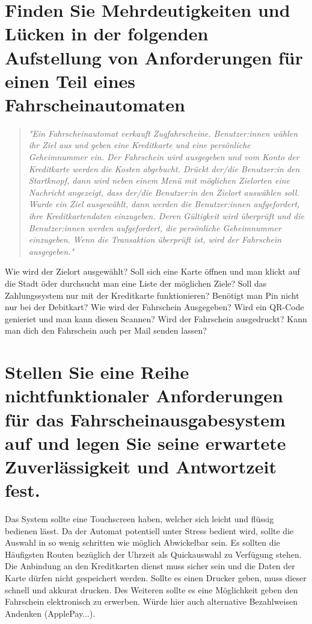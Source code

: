 \documentclass[12pt]{article}
\begin{document}
\section{Finden Sie Mehrdeutigkeiten und Lücken in der folgenden Aufstellung von Anforderungen für einen Teil
eines Fahrscheinautomaten}
\begin{quote}
\textit{"Ein Fahrscheinautomat verkauft Zugfahrscheine. Benutzer:innen wählen ihr Ziel aus und geben eine Kreditkarte und eine persönliche Geheimnummer ein. Der Fahrschein wird ausgegeben und vom Konto der
Kreditkarte werden die Kosten abgebucht. Drückt der/die Benutzer:in den Startknopf, dann wird neben einem Menü mit möglichen Zielorten eine Nachricht angezeigt, dass der/die Benutzer:in den Zielort auswählen soll. Wurde ein Ziel ausgewählt, dann werden die Benutzer:innen aufgefordert, ihre Kreditkartendaten
einzugeben. Deren Gültigkeit wird überprüft und die Benutzer:innen werden aufgefordert, die persönliche
Geheimnummer einzugeben. Wenn die Transaktion überprüft ist, wird der Fahrschein ausgegeben."}
\end{quote}
Wie wird der Zielort ausgewählt? Soll sich eine Karte öffnen und man klickt auf die Stadt öder durchsucht man eine Liste der möglichen Ziele? Soll das Zahlungssystem nur mit der Kreditkarte funktionieren? Benötigt man Pin nicht nur bei der Debitkart? Wie wird der Fahrschein Ausgegeben? Wird ein QR-Code genieriet und man kann diesen Scannen? Wird der Fahrschein ausgedruckt? Kann man dich den Fahrschein auch per Mail senden lassen?

\section{Stellen Sie eine Reihe nichtfunktionaler Anforderungen für das Fahrscheinausgabesystem auf und legen
Sie seine erwartete Zuverlässigkeit und Antwortzeit fest.}

Das System sollte eine Touchscreen haben, welcher sich leicht und flüssig bedienen lässt. Da der Automat potentiell unter Stress bedient wird, sollte die Auswahl in so wenig schritten wie möglich Abwickelbar sein. Es sollten die Häufigsten Routen bezüglich der Uhrzeit als Quickauswahl zu Verfügung stehen. Die Anbindung an den Kreditkarten dienst muss sicher sein und die Daten der Karte dürfen nicht gespeichert werden. Sollte es einen Drucker geben, muss dieser schnell und akkurat drucken. Des Weiteren sollte es eine Möglichkeit geben den Fahrschein elektronisch zu erwerben. Würde hier auch alternative Bezahlweisen Andenken (ApplePay...).
\pagebreak
\end{document}
